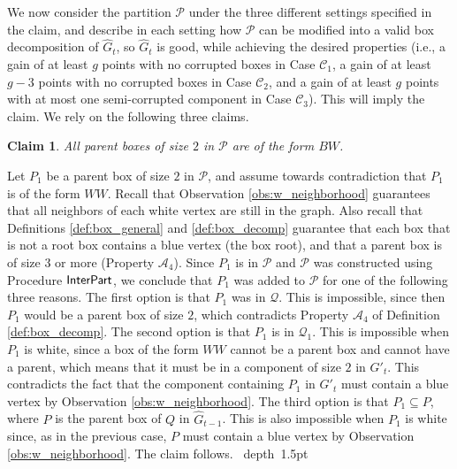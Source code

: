 \documentclass[11pt]{article}
\def\Proof{\par\noindent{\bf Proof:~}}
\def\blackslug{\hbox{\hskip 1pt \vrule width 4pt height 8pt
    depth 1.5pt \hskip 1pt}}
\def\QED{\quad\blackslug\lower 8.5pt\null\par}
\newtheorem{claim}[theorem]{Claim}
\theoremstyle{definition}
\def\decompsize{\mathcal{A}_4}
\def\boxpropnocorhigh{\mathcal{C}_1}
\def\boxpropnocorlow{\mathcal{C}_2}
\def\boxpropcor{\mathcal{C}_3}
\def\interpart{\mbox{\sf InterPart}}
\begin{document}
We now consider the partition $\mathcal{P}$ under the three different settings specified in the claim, and describe in each setting how $\mathcal{P}$ can be modified into a valid box decomposition of $\hat{G}_t$, so $\hat{G}_t$ is good, while achieving the desired properties (i.e., a gain of at least $g$ points with no corrupted boxes in Case $\boxpropnocorhigh$, a gain of at least $g - 3$ points with no corrupted boxes in Case $\boxpropnocorlow$, and a gain of at least $g$ points with at most one semi-corrupted component in Case $\boxpropcor$). This will imply the claim.
We rely on the following three claims.

\begin{claim}
\label{claim:ana_box:p1_bw}
All parent boxes of size $2$ in $\mathcal{P}$ are of the form $BW$.
\end{claim}
\Proof
Let $P_1$ be a parent box of size $2$ in $\mathcal{P}$, 
and assume towards contradiction that $P_1$ is of the form $WW$.
Recall that Observation \ref{obs:w_neighborhood} guarantees that all neighbors of each white vertex are still in the graph.
Also recall that Definitions \ref{def:box_general} and \ref{def:box_decomp} guarantee that each box that is not a root box contains a blue vertex (the box root), and that a parent box is of size $3$ or more (Property $\decompsize$).
Since $P_1$ is in $\mathcal{P}$ and $\mathcal{P}$ was constructed using Procedure $\interpart$, we conclude that $P_1$ was added to $\mathcal{P}$ for one of the following three reasons.
The first option is that $P_1$ was in $\mathcal{Q}$. This is impossible, since then $P_1$ would be a parent box of size $2$, which contradicts Property $\decompsize$ of Definition \ref{def:box_decomp}.
The second option is that $P_1$ is in $\mathcal{Q}_1$. This is impossible when $P_1$ is white, since a box of the form $WW$ cannot be a parent box and cannot have a parent, which means that it must be in a component of size $2$ in $G'_t$. This contradicts the fact that the component containing $P_1$ in $G'_t$ must contain a blue vertex by Observation \ref{obs:w_neighborhood}.
The third option is that $P_1 \subseteq P$, where $P$ is the parent box of $Q$ in $\hat{G}_{t-1}$. This is also impossible when $P_1$ is white since, as in the previous case, $P$ must contain a blue vertex by Observation \ref{obs:w_neighborhood}.
The claim follows.
\QED
\end{document}
